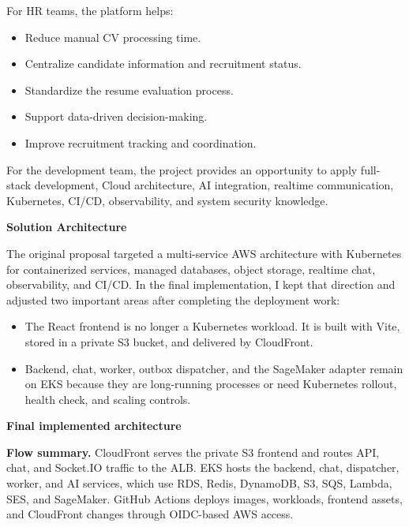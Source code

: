 For HR teams, the platform helps:

\begin{itemize}
\tightlist
\item
  Reduce manual CV processing time.
\item
  Centralize candidate information and recruitment status.
\item
  Standardize the resume evaluation process.
\item
  Support data-driven decision-making.
\item
  Improve recruitment tracking and coordination.
\end{itemize}

For the development team, the project provides an opportunity to apply
full-stack development, Cloud architecture, AI integration, realtime
communication, Kubernetes, CI/CD, observability, and system security
knowledge.

\vspace{0.5em}\noindent\textbf{Solution Architecture}\par

The original proposal targeted a multi-service AWS architecture with
Kubernetes for containerized services, managed databases, object
storage, realtime chat, observability, and CI/CD. In the final
implementation, I kept that direction and adjusted two important areas
after completing the deployment work:

\begin{itemize}
\tightlist
\item
  The React frontend is no longer a Kubernetes workload. It is built
  with Vite, stored in a private S3 bucket, and delivered by CloudFront.
\item
  Backend, chat, worker, outbox dispatcher, and the SageMaker adapter
  remain on EKS because they are long-running processes or need
  Kubernetes rollout, health check, and scaling controls.
\end{itemize}

\vspace{0.5em}\noindent\textbf{Final implemented
architecture}\par

\textbf{Flow summary.} CloudFront serves the private S3 frontend and
routes API, chat, and Socket.IO traffic to the ALB. EKS hosts the
backend, chat, dispatcher, worker, and AI services, which use RDS,
Redis, DynamoDB, S3, SQS, Lambda, SES, and SageMaker. GitHub Actions
deploys images, workloads, frontend assets, and CloudFront changes
through OIDC-based AWS access.

